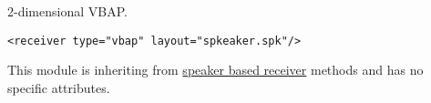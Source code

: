 2-dimensional VBAP.

\begin{lstlisting}[numbers=none]
<receiver type="vbap" layout="spkeaker.spk"/>
\end{lstlisting}

%

This module is inheriting from \hyperref[attrtab:speakerbased]{speaker
  based receiver} methods and has no specific attributes.
